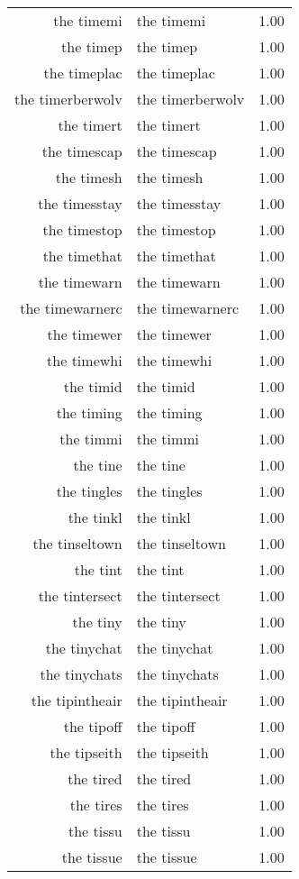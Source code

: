 \begin{table}[ht]
\begin{tabular}{rlr}
  the timemi & the timemi & 1.00 \\ 
  the timep & the timep & 1.00 \\ 
  the timeplac & the timeplac & 1.00 \\ 
  the timerberwolv & the timerberwolv & 1.00 \\ 
  the timert & the timert & 1.00 \\ 
  the timescap & the timescap & 1.00 \\ 
  the timesh & the timesh & 1.00 \\ 
  the timesstay & the timesstay & 1.00 \\ 
  the timestop & the timestop & 1.00 \\ 
  the timethat & the timethat & 1.00 \\ 
  the timewarn & the timewarn & 1.00 \\ 
  the timewarnerc & the timewarnerc & 1.00 \\ 
  the timewer & the timewer & 1.00 \\ 
  the timewhi & the timewhi & 1.00 \\ 
  the timid & the timid & 1.00 \\ 
  the timing & the timing & 1.00 \\ 
  the timmi & the timmi & 1.00 \\ 
  the tine & the tine & 1.00 \\ 
  the tingles & the tingles & 1.00 \\ 
  the tinkl & the tinkl & 1.00 \\ 
  the tinseltown & the tinseltown & 1.00 \\ 
  the tint & the tint & 1.00 \\ 
  the tintersect & the tintersect & 1.00 \\ 
  the tiny & the tiny & 1.00 \\ 
  the tinychat & the tinychat & 1.00 \\ 
  the tinychats & the tinychats & 1.00 \\ 
  the tipintheair & the tipintheair & 1.00 \\ 
  the tipoff & the tipoff & 1.00 \\ 
  the tipseith & the tipseith & 1.00 \\ 
  the tired & the tired & 1.00 \\ 
  the tires & the tires & 1.00 \\ 
  the tissu & the tissu & 1.00 \\ 
  the tissue & the tissue & 1.00 \\ 

\end{tabular}
\end{table}
